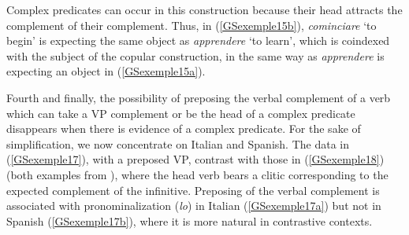 {\ea
{}
\z

Complex predicates can occur in this construction because their head attracts the complement of their complement. Thus, in (\ref{GSexemple15b}), \emph{cominciare} `to begin' is expecting the same object as \emph{apprendere} `to learn', which is coindexed with the subject of the copular construction, in the same way as \emph{apprendere} is expecting an object in (\ref{GSexemple15a}). 

Fourth and finally, the possibility of preposing the verbal complement of a verb which can take a VP complement or be the head of a complex predicate disappears when there is evidence of a complex predicate. For the sake of simplification, we now concentrate on Italian and Spanish. The data in (\ref{GSexemple17}), with a preposed VP, contrast with those in (\ref{GSexemple18}) (both examples from \citealt[132]{AG2010}), where the head verb bears a clitic corresponding to the expected complement of the infinitive. Preposing of the verbal complement is associated with pronominalization (\emph{lo}) in Italian (\ref{GSexemple17a}) but not in Spanish (\ref{GSexemple17b}), where it is more natural in contrastive contexts.

\begin{exe}
	\label{GSexemple17} 
	\begin{xlist}
	\label{GSexemple17a}
		 
	\label{GSexemple17b}
	\end{xlist}
\end{exe}

}
